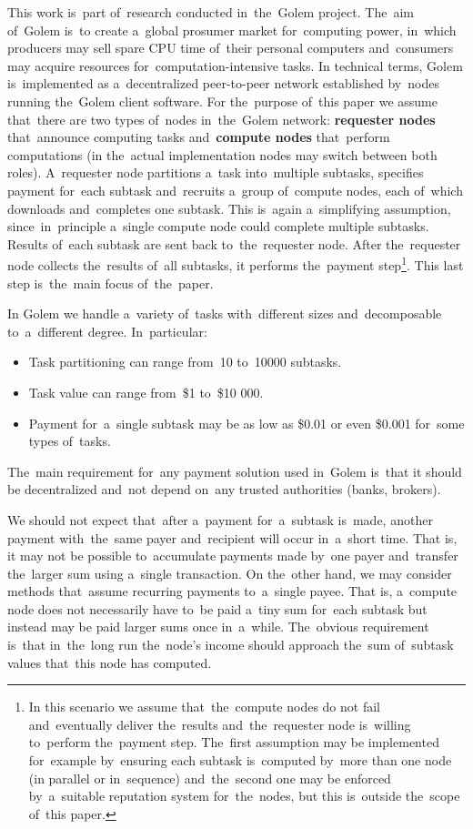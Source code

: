\documentclass[a4paper]{article}
\begin{document}
    This work  is~part of~research conducted in~the~Golem project. The~aim of~Golem  is~to create a~global prosumer
    market for~computing power, in~which producers may sell spare CPU time of~their personal computers and~consumers
    may acquire resources for~computation-intensive tasks. In technical terms, Golem  is~implemented as a~decentralized
    peer-to-peer network established by~nodes running the~Golem client software. For the~purpose of~this paper
    we assume that~there are two types of~nodes in~the~Golem network: \textbf{requester nodes} that~announce computing
    tasks and~\textbf{compute nodes} that~perform computations (in the~actual implementation nodes may switch between
    both roles).
    A~requester node partitions a~task into~multiple subtasks, specifies payment for~each subtask and~recruits
    a~group of~compute nodes, each of~which downloads and~completes one subtask. This  is~again a~simplifying
    assumption, since~in~principle a~single compute node could complete multiple subtasks.
    Results of~each subtask are sent back to~the~requester node. After the~requester node collects the~results of~all
    subtasks, it performs the~payment step\footnote{In this scenario we assume that~the~compute nodes do not fail
    and~eventually deliver the~results and~the~requester node  is~willing to~perform the~payment step.
    The~first assumption may be implemented for~example by~ensuring each subtask is~computed by~more than one node
    (in parallel or in~sequence) and~the~second one may be enforced by~a~suitable reputation system for~the~nodes,
    but this  is~outside the~scope of~this paper.}. This last step  is~the~main focus of~the~paper.

    In Golem we handle a~variety of~tasks with~different sizes and~decomposable to~a~different degree. In~particular:
    \begin{itemize}
        \item Task partitioning can range from~10 to~10000 subtasks.
        \item Task value can range from~\$1 to~\$10 000.
        \item Payment for~a~single subtask may be as low as \$0.01 or even \$0.001 for~some types of~tasks.
    \end{itemize}

    The~main requirement for~any payment solution used in~Golem  is~that it should be decentralized and~not depend
    on~any trusted authorities (banks, brokers).


    We should not expect that~after a~payment for~a~subtask  is~made, another payment with~the~same payer and~recipient
    will occur in~a~short time. That is, it may not be possible to~accumulate payments made by~one payer and~transfer
    the~larger sum using a~single transaction. On the~other hand, we may consider methods that~assume recurring
    payments to~a~single payee. That is, a~compute node does not necessarily have to~be paid a~tiny sum for~each
    subtask but instead may be paid larger sums once in~a~while. The~obvious requirement  is~that in~the~long run
    the~node's income should approach the~sum of~subtask values that~this node has computed.
\end{document}
